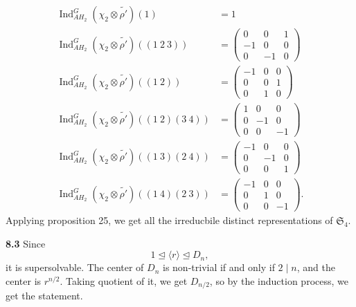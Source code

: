 \documentclass[a4paper, 12pt]{article}
\theoremstyle{Mydefinition}
\theoremstyle{Mytheorem}
\DeclareMathOperator{\Ind}{Ind}
\begin{document}
\begin{enumerate}
\begin{equation}
\begin{split}
        \Ind_{AH_2}^G \left(\chi_2\otimes \tilde{\rho'}\right) (1) &= 1\\
        \Ind_{AH_2}^G \left(\chi_2\otimes \tilde{\rho'}\right) ((1~2~3)) &= \begin{pmatrix}
        0 & 0 & 1\\
        -1 & 0 & 0\\
        0 & -1 & 0
        \end{pmatrix}\\
        \Ind_{AH_2}^G \left(\chi_2\otimes \tilde{\rho'}\right) ((1~2)) &= \begin{pmatrix}
        -1 & 0 & 0\\
        0 & 0 & 1\\
        0 & 1 & 0
        \end{pmatrix}\\
        \Ind_{AH_2}^G \left(\chi_2\otimes \tilde{\rho'}\right) ((1~2)(3~4)) &= \begin{pmatrix}
        1 & 0 & 0\\
        0 & -1 & 0\\
        0 & 0 & -1
        \end{pmatrix}\\
        \Ind_{AH_2}^G \left(\chi_2\otimes \tilde{\rho'}\right) ((1~3)(2~4)) &= \begin{pmatrix}
        -1 & 0 & 0\\
        0 & -1 & 0\\
        0 & 0 & 1
        \end{pmatrix}\\
        \Ind_{AH_2}^G \left(\chi_2\otimes \tilde{\rho'}\right) ((1~4)(2~3))&= \begin{pmatrix}
        -1 & 0 & 0\\
        0 & 1 & 0\\
        0 & 0 & -1
        \end{pmatrix}.
    \end{split}
    \end{equation}
    Applying proposition 25, we get all the irreducbile distinct representations of $\mathfrak{S}_4$.
\end{enumerate}

\noindent \textbf{8.3}
Since
\begin{equation}
    1\trianglelefteq \langle r\rangle \trianglelefteq D_n,
\end{equation}
it is supersolvable. The center of $D_n$ is non-trivial if and only if $2\mid n$, and the center is $r^{n/2}$. Taking quotient of it, we get $D_{n/2}$, so by the induction process, we get the statement.\\
\end{document}
